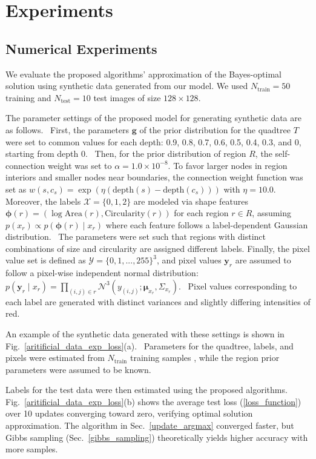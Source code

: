 \documentclass[conference]{IEEEtran}
\theoremstyle{definition}
\begin{document}
\label{update_argmax}

\section{Experiments}

\subsection{Numerical Experiments}

We evaluate the proposed algorithms' approximation of the Bayes-optimal solution using synthetic data generated from our model. We used $N_{\text{train}}=50$ training and $N_{\text{test}}=10$ test images of size $128 \times 128$.

The parameter settings of the proposed model for generating synthetic data are as follows. 
First, the parameters $\bm{g}$ of the prior distribution for the quadtree $T$ were set to common values for each depth: 0.9, 0.8, 0.7, 0.6, 0.5, 0.4, 0.3, and 0, starting from depth 0. 
Then, for the prior distribution of region $R$, the self-connection weight was set to $\alpha=1.0\times 10^{-8}$. To favor larger nodes in region interiors and smaller nodes near boundaries, the connection weight function was set as $w(s, c_s) = \exp(\eta (\mathrm{depth}(s) - \mathrm{depth}(c_s)))$ with $\eta=10.0$. 
Moreover, the labels $\mathcal{X}=\{0,1,2\}$ are modeled via shape features $\bm{\phi}(r) = (\log \text{Area}(r), \text{Circularity}(r))$ for each region $r \in R$, assuming $p(x_r) \propto p(\bm{\phi}(r) \mid x_r)$ where each feature follows a label-dependent Gaussian distribution. 
The parameters were set such that regions with distinct combinations of size and circularity are assigned different labels.
Finally, the pixel value set is defined as $\mathcal{Y}=\{0,1,...,255\}^3$, and pixel values $\bm{y}_r$ are assumed to follow a pixel-wise independent normal distribution: $p(\bm{y}_r\mid x_r) = \prod_{(i,j)\in r} \mathcal{N}^3(y_{(i,j)};\boldsymbol{\mu}_{x_r}, \Sigma_{x_r})$. 
Pixel values corresponding to each label are generated with distinct variances and slightly differing intensities of red.

An example of the synthetic data generated with these settings is shown in Fig.~\ref{aritificial_data_exp_loss}(a). 
Parameters for the quadtree, labels, and pixels were estimated from $N_{\text{train}}$ training samples \cite{wang_isita2024}, while the region prior parameters were assumed to be known. 

Labels for the test data were then estimated using the proposed algorithms.
Fig.~\ref{aritificial_data_exp_loss}(b) shows the average test loss (\ref{loss_function}) over 10 updates converging toward zero, verifying optimal solution approximation. The algorithm in Sec.~\ref{update_argmax} converged faster, but Gibbs sampling (Sec.~\ref{gibbs_sampling}) theoretically yields higher accuracy with more samples.
\end{document}
